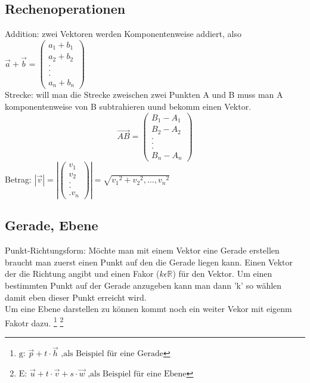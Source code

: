 \documentclass[a4paper,10pt]{scrartcl}
\begin{document}
            \subsection{Rechenoperationen}
            Addition: zwei Vektoren werden Komponentenweise addiert, also \(\vec a + \vec b = 
            \begin{pmatrix}
                a_1 + b_1\\
                a_2 + b_2\\
                .\\
                .\\.\\
                a_n + b_n    
            \end{pmatrix} \)\\
            Strecke: will man die Strecke zweischen zwei Punkten A und B muss man A komponentenweise von B subtrahieren uund bekomm einen Vektor. \[\vec {AB} = 
            \begin{pmatrix}
                B_1 - A_1 \\
                B_2 - A_2\\
                .\\
                .\\.\\
                B_n - A_n  
            \end{pmatrix}\]
            Betrag:
            \(
                |\vec{v}| = 
                |\begin{pmatrix}
                    v_1 \\ v_2 \\ . \\ . \\. v_n    
                \end{pmatrix}|
                = \sqrt{{v_1}^2 + {v_2}^2, \hdots, {v_n}^2}
            \)  
        \subsection{Gerade, Ebene}
            Punkt-Richtungsform: Möchte man mit einem Vektor eine Gerade erstellen braucht man zuerst einen Punkt auf den die Gerade liegen kann. Einen Vektor der die Richtung angibt 
            und einen Fakor ($k \epsilon \mathbb{R}$) für den Vektor. Um einen bestimmten Punkt auf der Gerade anzugeben kann man dann 'k' so wählen damit eben dieser Punkt erreicht wird.\\
            Um eine Ebene darstellen zu können kommt noch ein weiter Vekor mit eigenm Fakotr dazu.  
            \footnote{\(
                \text{g: } \vec{p} + t \cdot \vec{h} \text{ ,als Beispiel für eine Gerade}  
            \)}
            \footnote{\(
                \text{E: } \vec{u} + t \cdot \vec{v} + s \cdot \vec{w}  \text{ ,als Beispiel für eine Ebene}  
            \)}
\end{document}
